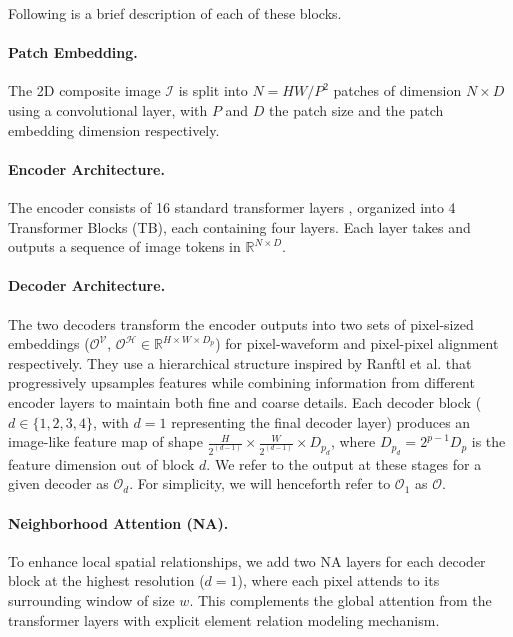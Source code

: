 Following is a brief description of each of these blocks. 
\vspace{-0.3cm}
\paragraph{Patch Embedding.} The 2D composite image $\mathcal{I}$ is split into $ N = HW/P^2$ patches of dimension $N\times D$ using a convolutional layer, with $P$ and $D$ the patch size and the patch embedding dimension respectively.
\vspace{-0.3cm}
\paragraph{Encoder Architecture.} The encoder consists of 16 standard transformer layers \citep{vaswani}, organized into 4 Transformer Blocks (TB), each containing four layers. Each layer takes and outputs a sequence of image tokens in $\mathbb{R}^{N \times D}$.
\vspace{-0.3cm}
\paragraph{Decoder Architecture.} The two decoders transform the encoder outputs into two sets of pixel-sized embeddings ($\mathcal{O}^\mathcal{V}$, $\mathcal{O}^\mathcal{H} \in \mathbb{R}^{H \times W \times D_p}$) for pixel-waveform and pixel-pixel alignment respectively. They use a hierarchical structure inspired by Ranftl et al.  that progressively upsamples features while combining information from different encoder layers to maintain both fine and coarse details. Each decoder block ($d \in \{1,2,3,4\}$, with $d=1$ representing the final decoder layer) produces an image-like feature map of shape $\frac{H}{2^{(d-1)}} \times \frac{W}{2^{(d-1)}} \times D_{p_{d}}$, where \(D_{p_d} = 2^{p-1}D_p\) is the feature dimension out of block $d$. We refer to the output at these stages for a given decoder as $\mathcal{O}_d$. For simplicity, we will henceforth refer to $\mathcal{O}_1$ as $\mathcal{O}$.  
\vspace{-0.3cm}
\paragraph{Neighborhood Attention (NA).} To enhance local spatial relationships, we add two NA layers \cite{hassani2023natten} for each decoder block at the highest resolution ($d=1$), where each pixel attends to its surrounding window of size $w$. This complements the global attention from the transformer layers with explicit element relation modeling mechanism.
\vspace{-0.3cm}
